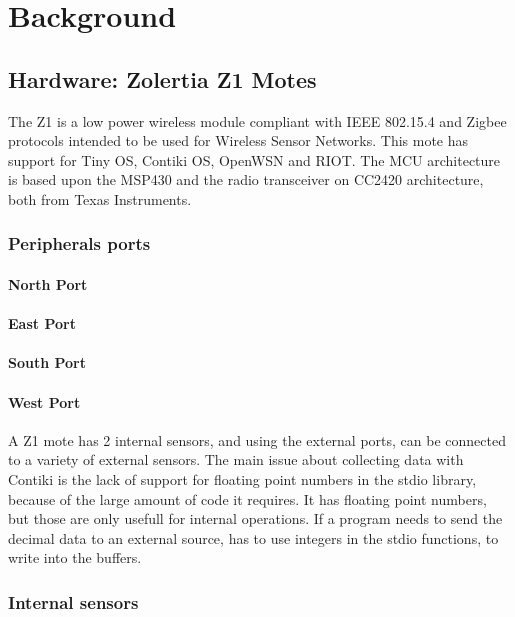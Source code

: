\section{Background}

\subsection{Hardware: Zolertia Z1 Motes}

The Z1 is a low power wireless module compliant with IEEE 802.15.4 and Zigbee protocols intended to be used for Wireless Sensor Networks.
This mote has support for Tiny OS,
	Contiki OS,
	OpenWSN and RIOT.
The MCU architecture is based upon the MSP430 and the radio transceiver on CC2420 architecture,
	both from Texas Instruments.

\subsubsection{Peripherals ports}

\paragraph*{North Port}
\paragraph*{East Port}
\paragraph*{South Port}
\paragraph*{West Port}


A Z1 mote has 2 internal sensors,
	and using the external ports,
	can be connected to a variety of external sensors.
The main issue about collecting data with Contiki is the lack of support for floating point numbers in the stdio library,
	because of the large amount of code it requires.
It has floating point numbers,
	but those are only usefull for internal operations.
If a program needs to send the decimal data to an external source,
	has to use integers in the stdio functions,
	to write into the buffers.

\subsubsection{Internal sensors}

